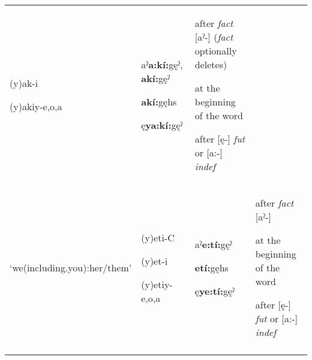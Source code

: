 \begin{table}
{\begin{tabularx}{\textwidth}{XXXX}
(y)ak-i

(y)akiy-e,o,a & aˀ\textbf{a:kí:}gęˀ, \textbf{akí:}gęˀ

\textbf{akí:}gęhs

ę\textbf{ya:kí:}gęˀ & after \textit{fact} [aˀ-] (\textit{fact} optionally deletes)

at the beginning of the word 

after [ę-] \textit{fut} or [a:-] \textit{indef}\\
‘we(including.you):her/them’ & (y)eti-C

(y)et-i

(y)etiy-e,o,a & aˀ\textbf{e:tí:}gęˀ

\textbf{etí:}gęhs

ę\textbf{ye:tí:}gęˀ & after \textit{fact} [aˀ-] 

at the beginning of the word 

after [ę-] \textit{fut} or [a:-] \textit{indef}\\
\lspbottomrule
\end{tabularx}}
\end{table}


